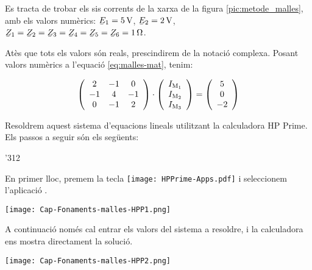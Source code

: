 \begin{exemple}\label{ex:Malles}
	\addcontentsxms{\Malles}	
    Es tracta de trobar els sis corrents de la xarxa de la figura \vref{pic:metode_malles}, amb els valors numèrics: $\cmplx{E}_1=\qty{5}{V}$, $\cmplx{E}_2=\qty{2}{V}$, $\cmplx{Z}_1=\cmplx{Z}_2=\cmplx{Z}_3=\cmplx{Z}_4=\cmplx{Z}_5=\cmplx{Z}_6=\qty{1}{\ohm}$.

    Atès que tots els valors són reals, prescindirem de la notació complexa. Posant valors numèrics a l'equació \eqref{eq:malles-mat}, tenim:

    \[
      \left(
        \begin{array}{ccc}
          2 & -1 &  0 \\
         -1 &  4 & -1 \\
          0 &  -1 & 2 \\
        \end{array}
      \right)
      \cdot
      \left(
          \begin{array}{c}
            I_\mathrm{M_1} \\
            I_\mathrm{M_2} \\
            I_\mathrm{M_3} \\
          \end{array}
      \right)
      =
      \left(
          \begin{array}{c}
            5 \\
            0 \\
            -2 \\
          \end{array}
      \right)
    \]

    Resoldrem aquest sistema d'equacions lineals utilitzant la calculadora \textsf{HP Prime}. Els passos a seguir són els següents:

    \begin{dingautolist}{'312}
     \item En primer lloc, premem la tecla \texttt{[image: HPPrime-Apps.pdf]} i seleccionem l'aplicació .

         \texttt{[image: Cap-Fonaments-malles-HPP1.png]}
    \item A continuació només cal entrar els valors del sistema a resoldre, i la calculadora ens mostra directament la solució.

         \texttt{[image: Cap-Fonaments-malles-HPP2.png]}
    \end{dingautolist}


\end{exemple}
